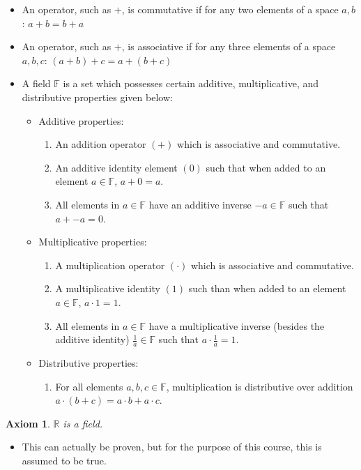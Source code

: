 \documentclass{article}
\newtheorem{axiom}{Axiom}
\begin{document}
\begin{itemize}
	\item An operator, such as $+$, is commutative if for any two elements of a space $a, b$: $a + b = b + a$
	\item An operator, such as $+$, is associative if for any three elements of a space $a, b, c$: $(a + b) + c = a + (b + c)$
	\item A field $\mathbb{F}$ is a set which possesses certain additive, multiplicative, and distributive properties given below:
	\begin{itemize}
		\item Additive properties:
		\begin{enumerate}
			\item An addition operator $(+)$ which is associative and commutative.
			\item An additive identity element $(0)$ such that when added to an element $a \in \mathbb{F}$, $a + 0 = a$.
			\item All elements in $a \in \mathbb{F}$ have an additive inverse $-a \in \mathbb{F}$ such that $a + -a = 0$.
		\end{enumerate}
		\item Multiplicative properties:
		\begin{enumerate}
			\item A multiplication operator $(\cdot)$ which is associative and commutative.
			\item A multiplicative identity $(1)$ such than when added to an element $a \in \mathbb{F}$, $a \cdot 1 = 1$.
			\item All elements in $a \in \mathbb{F}$ have a multiplicative inverse (besides the additive identity) $\frac{1}{a} \in \mathbb{F}$ such that $a \cdot \frac{1}{a} = 1$.
		\end{enumerate}
		\item Distributive properties:
		\begin{enumerate}
			\item For all elements $a, b, c \in \mathbb{F}$, multiplication is distributive over addition $a \cdot (b + c) = a \cdot b + a \cdot c$.
		\end{enumerate}
	\end{itemize}

\end{itemize}

\begin{axiom}
	$\mathbb{R}$ is a field.
\end{axiom}

\begin{itemize}
	\item This can actually be proven, but for the purpose of this course, this is assumed to be true.
\end{itemize}
\end{document}
